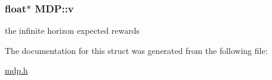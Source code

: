 \subsubsection[{\texorpdfstring{v}{v}}]{\setlength{\rightskip}{0pt plus 5cm}float$\ast$ M\+D\+P\+::v}\hypertarget{structMDP_ade484756ff98adafbc4c5ebbd2668b2d}{}\label{structMDP_ade484756ff98adafbc4c5ebbd2668b2d}
the infinite horizon expected rewards 

The documentation for this struct was generated from the following file\+:\begin{DoxyCompactItemize}
\item 
\hyperlink{mdp_8h}{mdp.\+h}\end{DoxyCompactItemize}
